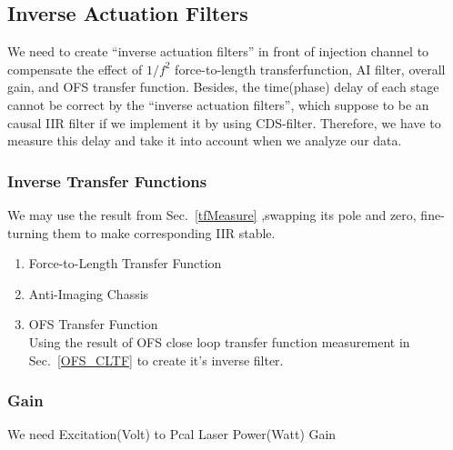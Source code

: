 \subsection{Inverse Actuation Filters}
We need to create “inverse actuation filters” in front of injection channel to compensate the effect of $1/f^2$ force-to-length transferfunction, AI filter, overall gain, and OFS transfer function\cite{ligo:inj}. Besides, the time(phase) delay of each stage cannot be correct by the “inverse actuation filters”, which suppose to be an causal IIR filter if we implement it by using CDS-filter. Therefore, we have to measure this delay and take it into account when we analyze our data.
    \subsubsection{Inverse Transfer Functions}
        We may use the result from Sec.~\ref{tfMeasure} ,swapping its pole and zero, fine-turning them to make corresponding IIR stable.
        \begin{enumerate}
            \item Force-to-Length Transfer Function
            \item Anti-Imaging Chassis   
            \item OFS Transfer Function \\
            Using the result of OFS close loop transfer function measurement in Sec.~\ref{OFS_CLTF} to create it's inverse filter. 
        \end{enumerate}


    \subsubsection{Gain}
    We need Excitation(Volt) to Pcal Laser Power(Watt) Gain
    
